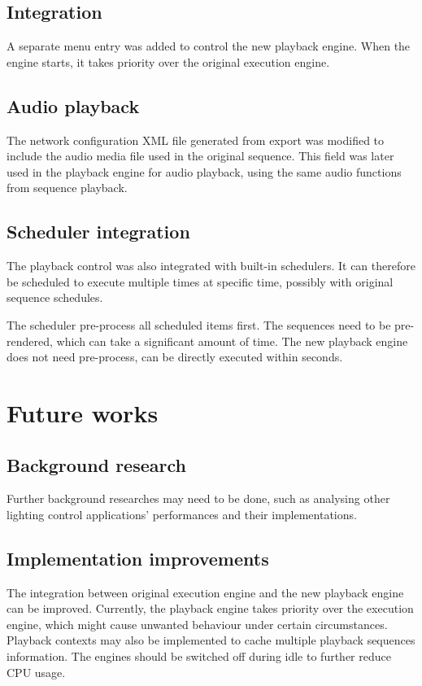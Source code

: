 \documentclass[journal]{IEEEtran}
\begin{document}
\subsection{Integration}

A separate menu entry was added to control the new playback engine. When the engine starts, it takes priority over the original execution engine.

\subsection{Audio playback}

The network configuration XML file generated from export was modified to include the audio media file used in the original sequence. This field was later used in the playback engine for audio playback, using the same audio functions from sequence playback.

\subsection{Scheduler integration}

The playback control was also integrated with built-in schedulers. It can therefore be scheduled to execute multiple times at specific time, possibly with original sequence schedules.

The scheduler pre-process all scheduled items first. The sequences need to be pre-rendered, which can take a significant amount of time. The new playback engine does not need pre-process, can be directly executed within seconds.

\section{Future works}

\subsection{Background research}

Further background researches may need to be done, such as analysing other lighting control applications' performances and their implementations.

\subsection{Implementation improvements}

The integration between original execution engine and the new playback engine can be improved. Currently, the playback engine takes priority over the execution engine, which might cause unwanted behaviour under certain circumstances. Playback contexts may also be implemented to cache multiple playback sequences information. The engines should be switched off during idle to further reduce CPU usage.
\end{document}
